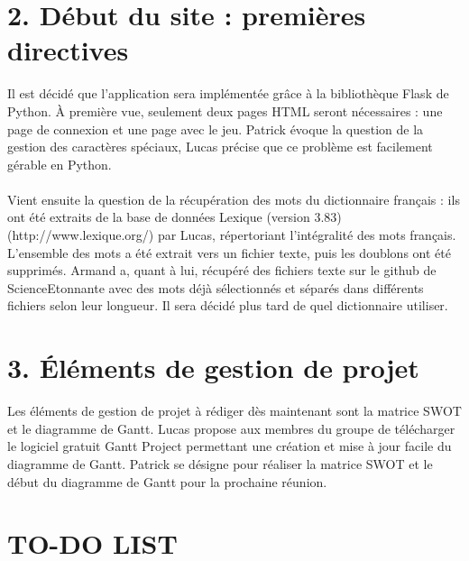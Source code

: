 \section*{2. Début du site : premières directives}
\tabto{1cm}Il est décidé que l’application sera implémentée grâce à la bibliothèque Flask de Python. À première vue, seulement deux pages HTML seront nécessaires : une page de connexion et une page avec le jeu. Patrick évoque la question de la gestion des caractères spéciaux, Lucas précise que ce problème est facilement gérable en Python.\\ \\
\tabto{1cm}Vient ensuite la question de la récupération des mots du dictionnaire français : ils ont été extraits de la base de données Lexique (version 3.83) (http://www.lexique.org/) par Lucas, répertoriant l’intégralité des mots français. L’ensemble des mots a été extrait vers un fichier texte, puis les doublons ont été supprimés. Armand a, quant à lui, récupéré des fichiers texte sur le github de ScienceEtonnante avec des mots déjà sélectionnés et séparés dans différents fichiers selon leur longueur. Il sera décidé plus tard de quel dictionnaire utiliser.

\section*{3. Éléments de gestion de projet}
\tabto{1cm}Les éléments de gestion de projet à rédiger dès maintenant sont la matrice SWOT et le diagramme de Gantt. Lucas propose aux membres du groupe de télécharger le logiciel gratuit Gantt Project permettant une création et mise à jour facile du diagramme de Gantt. Patrick se désigne pour réaliser la matrice SWOT et le début du diagramme de Gantt pour la prochaine réunion.

\section*{TO-DO LIST}

